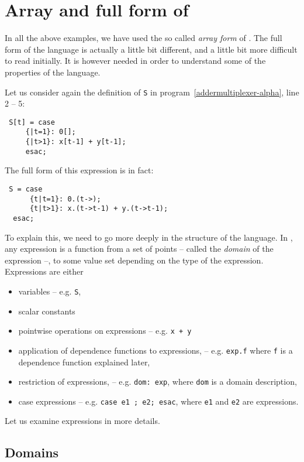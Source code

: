 %
\section{Array and full form of {\alfa}}
\label{arrayform}

In all the above examples, we have used the so called {\em array
form} of {\alfa}. The full form of
the language is actually a little bit different, and a little bit more
difficult to read initially. It is however needed in order to
understand some of the properties of the language.

Let us consider again the definition of {\tt S} in
program~\ref{addermultiplexer-alpha}, line 2 -- 5:
\begin{verbatim}
 S[t] = case
     {|t=1}: 0[];
     {|t>1}: x[t-1] + y[t-1];
     esac;
\end{verbatim}
The full form of this expression is in fact: 
\begin{verbatim}
 S = case
      {t|t=1}: 0.(t->);
      {t|t>1}: x.(t->t-1) + y.(t->t-1);
  esac;
\end{verbatim}
To explain this, we need to go more deeply in the 
structure of the language. In {\alfa}, any expression is a function from
a set of points -- called the {\em domain} of the expression --, 
to some value set depending on the type of the expression. 
Expressions are either 
\begin{itemize}
\item variables -- e.g. {\tt S}, 
\item scalar constants
\item pointwise operations on expressions -- e.g. {\tt x + y}
\item application of dependence functions to expressions, -- e.g. 
{\tt exp.f} where {\tt f} is a dependence function explained later,
\item restriction of expressions, -- e.g. {\tt dom: exp}, where 
{\tt dom} is a domain description,
\item case expressions -- e.g. {\tt case e1 ; e2; esac}, where {\tt e1}
and {\tt e2} are expressions.
\end{itemize}

Let us examine expressions in more details. 
\subsection{Domains}

